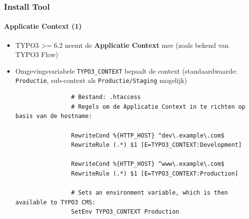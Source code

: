 
\begin{frame}[fragile]
	\frametitle{Install Tool}
	\framesubtitle{Applicatie Context (1)}

	\begin{itemize}
		\item TYPO3 >= 6.2 neemt de \textbf{Applicatie Context} mee\newline
			\smaller(zoals bekend van TYPO3 Flow)\normalsize
		\item Omgevingsvariabele \texttt{TYPO3\_CONTEXT} bepaalt de context\newline
			\smaller(standaardwaarde: \texttt{Productie}, sub-context als \texttt{Productie/Staging} mogelijk)\normalsize

			\begin{lstlisting}
				# Bestand: .htaccess
				# Regels om de Applicatie Context in te richten op basis van de hostname:

				RewriteCond %{HTTP_HOST} ^dev\.example\.com$
				RewriteRule (.*) $1 [E=TYPO3_CONTEXT:Development]

				RewriteCond %{HTTP_HOST} ^www\.example\.com$
				RewriteRule (.*) $1 [E=TYPO3_CONTEXT:Production]

				# Sets an environment variable, which is then available to TYPO3 CMS:
				SetEnv TYPO3_CONTEXT Production
			\end{lstlisting}

	\end{itemize}

\end{frame}


